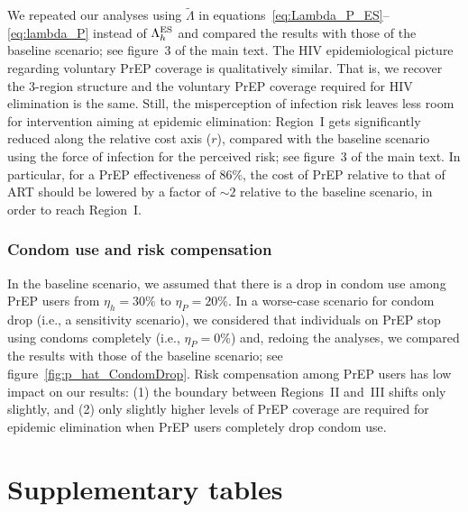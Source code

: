 \documentclass[12pt]{article}
\begin{document}
We repeated our analyses using $\tilde{\Lambda}$ in equations~\eqref{eq:Lambda_P_ES}--\eqref{eq:lambda_P} instead of $\Lambda_h^{\rm ES}$ and compared the results with those of the baseline scenario; see figure~3 of the main text. The HIV epidemiological picture regarding voluntary PrEP coverage is qualitatively similar. That is, we recover the 3-region structure and the voluntary PrEP coverage required for HIV elimination is the same. Still, the misperception of infection risk leaves less room for intervention aiming at epidemic elimination: Region~I gets significantly reduced along the relative cost axis ($r$), compared with the baseline scenario using the force of infection for the perceived risk; see figure~3 of the main text. In particular, for a PrEP effectiveness of 86\%, the cost of PrEP relative to that of ART should be lowered by a factor of $\sim 2$ relative to the baseline scenario, in order to reach Region~I. 

\subsubsection{Condom use and risk compensation}

In the baseline scenario, we assumed that there is a drop in condom use among PrEP users from $\eta_h=30\%$ to $\eta_P=20\%$. In a worse-case scenario for condom drop (i.e., a sensitivity scenario), we considered that individuals on PrEP stop using condoms completely (i.e., $\eta_P=0\%$) and, redoing the analyses, we compared the results with those of the baseline scenario; see figure~\ref{fig:p_hat_CondomDrop}. Risk compensation among PrEP users has low impact on our results: (1) the boundary between Regions~II and~III shifts only slightly, and (2) only slightly higher levels of PrEP coverage are required for epidemic elimination when PrEP users completely drop condom use.

\newpage
\section{Supplementary tables}
\end{document}
